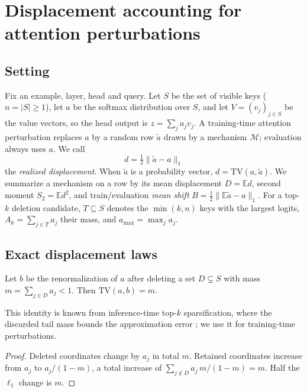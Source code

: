 \section{Displacement accounting for attention perturbations}\label{sec:theory}

\subsection{Setting}
Fix an example, layer, head and query. Let $S$ be the set of visible keys ($n=|S|\ge 1$), let
$a$ be the softmax distribution over $S$, and let $V=(v_j)_{j\in S}$ be the value vectors, so the
head output is $z=\sum_j a_j v_j$. A training-time attention perturbation replaces $a$ by a random
row $\tilde a$ drawn by a mechanism $\mathcal M$; evaluation always uses $a$. We call
\begin{equation}
 d=\tfrac12\lVert\tilde a-a\rVert_1
\end{equation}
the \emph{realized displacement}. When $\tilde a$ is a probability vector, $d=\mathrm{TV}(a,\tilde a)$.
We summarize a mechanism on a row by its mean displacement $D=\mathbb E d$, second moment
$S_2=\mathbb E d^2$, and train/evaluation \emph{mean shift} $B=\tfrac12\lVert\mathbb E\tilde a-a\rVert_1$.
For a top-$k$ deletion candidate, $T\subseteq S$ denotes the $\min(k,n)$ keys with the largest logits,
$A_k=\sum_{j\in T}a_j$ their mass, and $a_{\max}=\max_j a_j$.

\subsection{Exact displacement laws}
\begin{proposition}\label{prop:deletion}
Let $b$ be the renormalization of $a$ after deleting a set $D\subsetneq S$ with mass $m=\sum_{j\in D}a_j<1$.
Then $\mathrm{TV}(a,b)=m$.
\end{proposition}
This identity is known from inference-time top-$k$ sparsification, where the discarded tail mass bounds the
approximation error \citep{tzachristas2025topk}; we use it for training-time perturbations.
\begin{proof}
Deleted coordinates change by $a_j$ in total $m$. Retained coordinates increase from $a_j$ to
$a_j/(1-m)$, a total increase of $\sum_{j\notin D}a_j\,m/(1-m)=m$. Half the $\ell_1$ change is $m$.
\end{proof}

